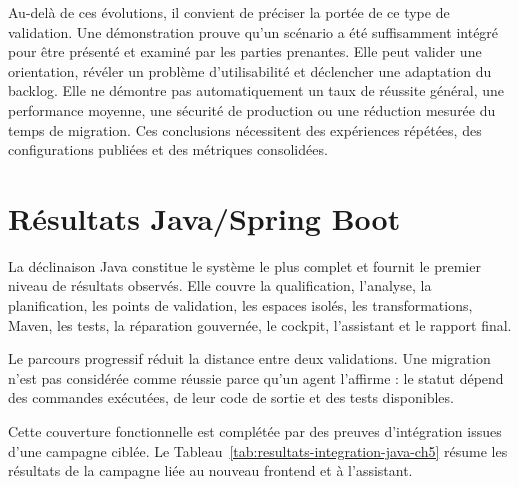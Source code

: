 Au-delà de ces évolutions, il convient de préciser la portée de ce type de validation. Une démonstration prouve qu'un scénario a été suffisamment intégré pour être présenté et examiné par les parties prenantes. Elle peut valider une orientation, révéler un problème d'utilisabilité et déclencher une adaptation du backlog. Elle ne démontre pas automatiquement un taux de réussite général, une performance moyenne, une sécurité de production ou une réduction mesurée du temps de migration. Ces conclusions nécessitent des expériences répétées, des configurations publiées et des métriques consolidées.

\section{Résultats Java/Spring Boot}

La déclinaison Java constitue le système le plus complet et fournit le premier niveau de résultats observés. Elle couvre la qualification, l'analyse, la planification, les points de validation, les espaces isolés, les transformations, Maven, les tests, la réparation gouvernée, le cockpit, l'assistant et le rapport final.

Le parcours progressif réduit la distance entre deux validations. Une migration n'est pas considérée comme réussie parce qu'un agent l'affirme : le statut dépend des commandes exécutées, de leur code de sortie et des tests disponibles.

Cette couverture fonctionnelle est complétée par des preuves d'intégration issues d'une campagne ciblée. Le Tableau~\ref{tab:resultats-integration-java-ch5} résume les résultats de la campagne liée au nouveau frontend et à l'assistant.

